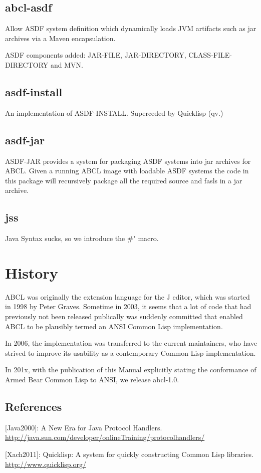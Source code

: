 \documentclass[10pt]{book}
\begin{document}
\section{abcl-asdf} 

Allow ASDF system definition which dynamically loads JVM artifacts
such as jar archives via a Maven encapsulation.

ASDF components added:  JAR-FILE, JAR-DIRECTORY, CLASS-FILE-DIRECTORY
and MVN.

\section{asdf-install}

An implementation of ASDF-INSTALL.  Superceded by Quicklisp (qv.)

\section{asdf-jar}

ASDF-JAR provides a system for packaging ASDF systems into jar
archives for ABCL.  Given a running ABCL image with loadable ASDF
systems the code in this package will recursively package all the
required source and fasls in a jar archive.

\section{jss}

Java Syntax sucks, so we introduce the \#" macro.


\chapter{History}

ABCL was originally the extension language for the J editor, which was
started in 1998 by Peter Graves.  Sometime in 2003, it seems that a
lot of code that had previously not been released publically was
suddenly committed that enabled ABCL to be plausibly termed an ANSI
Common Lisp implementation.  

In 2006, the implementation was transferred to the current
maintainers, who have strived to improve its usability as a
contemporary Common Lisp implementation.

In 201x, with the publication of this Manual explicitly stating the
conformance of Armed Bear Common Lisp to ANSI, we release abcl-1.0.




\section{References}

[Java2000]:  A New Era for Java Protocol Handlers.
\url{http://java.sun.com/developer/onlineTraining/protocolhandlers/}

[Xach2011]:  Quicklisp:  A system for quickly constructing Common Lisp
libraries.  \url{http://www.quicklisp.org/}
\end{document}

